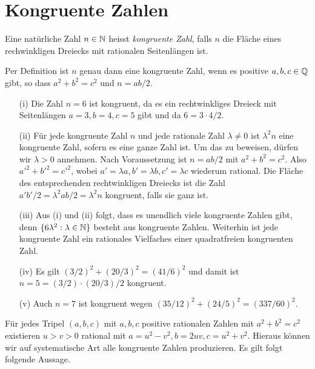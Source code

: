 \chapter{Kongruente Zahlen}

\begin{definition}
  Eine natürliche Zahl $n\in{\mathbb{N}}$ heisst \emph{kongruente
    Zahl}, falls
  $n$ die Fläche eines rechwinkligen Dreiecks mit rationalen
  Seitenlängen ist. 
\end{definition}

\begin{bemerkung}
  Per Definition ist $n$ genau dann eine kongruente Zahl, wenn es positive
  $a,b,c\in{\mathbb{Q}}$ gibt, so dass $a^2+b^2=c^2$ und $n = ab/2$. 
\end{bemerkung}

\begin{beispiel}\leavevmode
  \begin{enumerate}
  \item [(i)]
    Die Zahl $n=6$ ist kongruent, da es ein rechtwinkliges Dreieck mit Seitenlängen
    $a=3,b=4,c=5$  gibt und da $6=3\cdot 4/2$. 
  \item[(ii)]
    Für jede kongruente Zahl $n$ und jede rationale Zahl
    $\lambda\not=0$ ist $\lambda^2 n$ eine kongruente Zahl, sofern es
    eine ganze Zahl ist. Um das zu
    beweisen, dürfen wir $\lambda > 0$ annehmen. Nach Voraussetzung
    ist $n=ab/2$ mit $a^2+b^2=c^2$. Also ${a'}^2+{b'}^2={c'}^2$, wobei
    $a'=\lambda a, b'=\lambda b, c'=\lambda c$ wiederum rational.
    Die Fläche des entsprechenden rechtwinkligen Dreiecks ist die
    Zahl $a'b'/2
    = \lambda^2 ab/2 = \lambda^2 n$ kongruent, falls sie ganz ist.
  \item[(iii)]
    Aus (i) und (ii) folgt, dass es unendlich viele kongruente Zahlen
    gibt, denn $\{6\lambda^2 : \lambda\in{\mathbb{N}}\}$ besteht aus kongruente
    Zahlen.
    Weiterhin ist jede kongruente Zahl ein rationales Vielfaches
    einer quadratfreien kongruenten Zahl.

  \item[(iv)] Es gilt $(3/2)^2 +(20/3)^2 = (41/6)^2$  und damit ist
    $n=5= (3/2)\cdot(20/3)/2$ kongruent.
    
  \item[(v)] Auch $n=7$ ist kongruent wegen $(35/12)^2 +
    (24/5)^2=(337/60)^2$.

  \end{enumerate}  
\end{beispiel}
Für jedes Tripel $(a,b,c)$ mit $a,b,c$ positive rationalen Zahlen mit
$a^2+b^2=c^2$ existieren $u>v>0$ rational mit $a =
u^2-v^2,b=2uv,c=u^2+v^2$. Hieraus können wir auf systematische Art
alle kongruente Zahlen produzieren. Es gilt folgt folgende Aussage.

